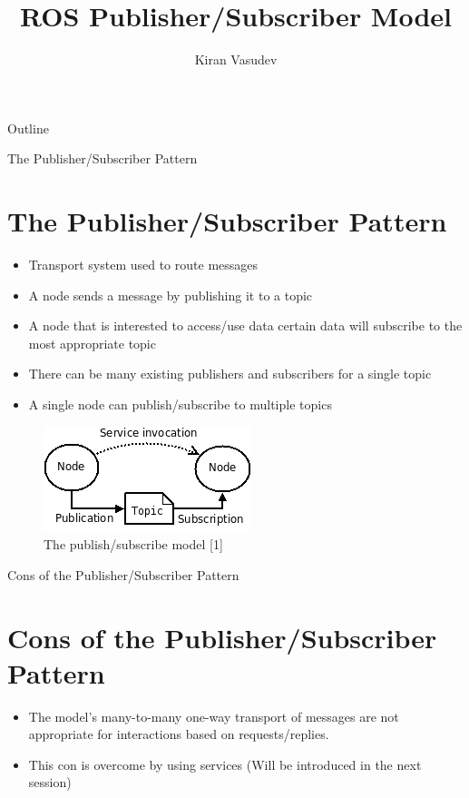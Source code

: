 \documentclass{beamer}
\title{ROS Publisher/Subscriber Model}
\author{Kiran Vasudev\inst{1}}
\institute[] 
{
  \inst{1}
  Hochschule Bonn-Rhein-Sieg

}
\begin{document}
\begin{frame}
  \titlepage
\end{frame}

\begin{frame}{Outline}
  \tableofcontents
\end{frame}

\begin{frame}{The Publisher/Subscriber Pattern}
\section{The Publisher/Subscriber Pattern}
  \begin{itemize}
  \item {
	Transport system used to route messages
  }
  \item {
	A node sends a message by publishing it to a topic
  }
  \item {A node that is interested to access/use data certain data will subscribe to the most appropriate topic}
  \item{There can be many existing publishers and subscribers for a single topic}
  \item{A single node can publish/subscribe to multiple topics}
  \end{itemize}
\end{frame}

\begin{frame}
	\begin{figure}
		\begin{center}
			\includegraphics[scale=0.8]{images/basic_ros}
			\caption{The publish/subscribe model [1]}	
		\end{center}
	\end{figure}
\end{frame}


\begin{frame}{Cons of the Publisher/Subscriber Pattern}
\section{Cons of the Publisher/Subscriber Pattern}
  \begin{itemize}
  \item {
    The model's many-to-many one-way transport of messages are not appropriate for interactions based on requests/replies.
  }
  \item {   
    This con is overcome by using services (Will be introduced in the next session)
  }	
  \end{itemize}

\end{frame}
\end{document}
